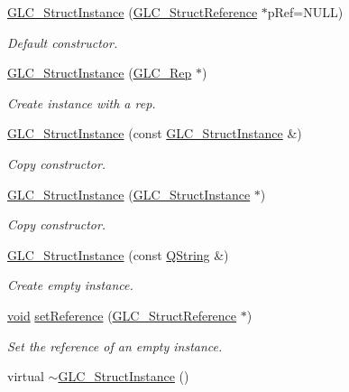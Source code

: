 \begin{DoxyCompactItemize}
\item 
\hyperlink{class_g_l_c___struct_instance_a0b5f3faa5b7b4809c060076c4ad1ae9d}{G\-L\-C\-\_\-\-Struct\-Instance} (\hyperlink{class_g_l_c___struct_reference}{G\-L\-C\-\_\-\-Struct\-Reference} $\ast$p\-Ref=N\-U\-L\-L)
\begin{DoxyCompactList}\small\item\em Default constructor. \end{DoxyCompactList}\item 
\hyperlink{class_g_l_c___struct_instance_a3a50d981565e7a4b03444ef08c72a774}{G\-L\-C\-\_\-\-Struct\-Instance} (\hyperlink{class_g_l_c___rep}{G\-L\-C\-\_\-\-Rep} $\ast$)
\begin{DoxyCompactList}\small\item\em Create instance with a rep. \end{DoxyCompactList}\item 
\hyperlink{class_g_l_c___struct_instance_afb857e2847d7966d15b95630dd6f6016}{G\-L\-C\-\_\-\-Struct\-Instance} (const \hyperlink{class_g_l_c___struct_instance}{G\-L\-C\-\_\-\-Struct\-Instance} \&)
\begin{DoxyCompactList}\small\item\em Copy constructor. \end{DoxyCompactList}\item 
\hyperlink{class_g_l_c___struct_instance_a67fe0f4e978b2d0f4a9003e8ae95dbd6}{G\-L\-C\-\_\-\-Struct\-Instance} (\hyperlink{class_g_l_c___struct_instance}{G\-L\-C\-\_\-\-Struct\-Instance} $\ast$)
\begin{DoxyCompactList}\small\item\em Copy constructor. \end{DoxyCompactList}\item 
\hyperlink{class_g_l_c___struct_instance_aa7a42283d2bdab739ecd28f25a01f87e}{G\-L\-C\-\_\-\-Struct\-Instance} (const \hyperlink{group___u_a_v_objects_plugin_gab9d252f49c333c94a72f97ce3105a32d}{Q\-String} \&)
\begin{DoxyCompactList}\small\item\em Create empty instance. \end{DoxyCompactList}\item 
\hyperlink{group___u_a_v_objects_plugin_ga444cf2ff3f0ecbe028adce838d373f5c}{void} \hyperlink{class_g_l_c___struct_instance_a27983fede5a044d2f36eb97c406dbe61}{set\-Reference} (\hyperlink{class_g_l_c___struct_reference}{G\-L\-C\-\_\-\-Struct\-Reference} $\ast$)
\begin{DoxyCompactList}\small\item\em Set the reference of an empty instance. \end{DoxyCompactList}\item 
virtual \hyperlink{class_g_l_c___struct_instance_a822212e5a83e11ec502bc8c73eaf676e}{$\sim$\-G\-L\-C\-\_\-\-Struct\-Instance} ()
\end{DoxyCompactItemize}
